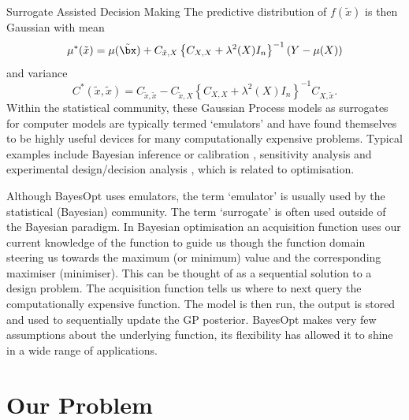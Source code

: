 \begin{chapter}{Surrogate Assisted Decision Making \label{Chap:optimisation}}
The predictive distribution of $f(\tilde{x})$ is then Gaussian with mean
\begin{equation}
  \mu^{*}(\tilde{x}) = \mu(\tilde{\bx}) + C_{\tilde{x}, X} \left\{ C_{X, X} + \lambda^2(X)I_n \right\}^{-1}(Y - \mu(X))
\end{equation}
and variance
\begin{equation}
  C^{*}(\tilde{x}, \tilde{x}) = C_{\tilde{x}, \tilde{x}} - C_{\tilde{x}, X} \left\{ C_{X, X} + \lambda^2(X)I_n \right\}^{-1}C_{X, \tilde{x}}.
\end{equation}
Within the statistical community, these Gaussian Process models as surrogates for computer models are typically termed `emulators' and have found themselves to be highly useful devices for many computationally expensive problems. Typical examples include Bayesian inference or calibration \citep{Ohagan01, Oyebamiji2019}, sensitivity analysis \citep{Oakley04,Marrel2012, Overstall2016} and experimental design/decision analysis \citep{Overstall2017, Wilson2018}, which is related to optimisation.

Although BayesOpt uses emulators, the term `emulator' is usually used by the statistical (Bayesian) community. The term `surrogate' is often used outside of the Bayesian paradigm. In Bayesian optimisation an acquisition function uses our current knowledge of the function to guide us though the function domain steering us towards the maximum (or minimum) value and the corresponding maximiser (minimiser). This can be thought of as a sequential solution to a design problem. The acquisition function tells us where to next query the computationally expensive function. The model is then run, the output is stored and used to sequentially update the GP posterior. BayesOpt makes very few assumptions about the underlying function, its flexibility has allowed it to shine in a wide range of applications.

\section{Our Problem}


\end{chapter}
